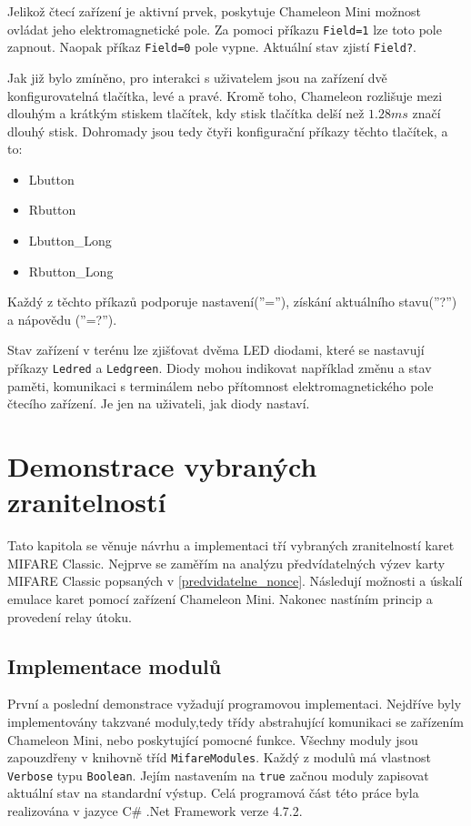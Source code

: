 Jelikož čtecí zařízení je aktivní prvek, poskytuje Chameleon Mini možnost ovládat jeho elektromagnetické pole. Za pomoci příkazu \verb|Field=1| lze toto pole zapnout. Naopak příkaz \verb|Field=0| pole vypne. Aktuální stav zjistí \verb|Field?|.\par
Jak již bylo zmíněno, pro interakci s uživatelem jsou na zařízení dvě konfigurovatelná tlačítka, levé a pravé. Kromě toho, Chameleon rozlišuje mezi dlouhým a krátkým stiskem tlačítek, kdy stisk tlačítka delší než $1.28ms$ značí dlouhý stisk. Dohromady jsou tedy čtyři konfigurační příkazy těchto tlačítek, a to:
\begin{itemize}
\item Lbutton
\item Rbutton
\item {Lbutton\_Long}
\item {Rbutton\_Long}
\end{itemize}
Každý z těchto příkazů podporuje nastavení(''=''), získání aktuálního stavu(''?'') a nápovědu (''=?''). \par
Stav zařízení v terénu lze zjišťovat dvěma LED diodami, které se nastavují příkazy \verb|Ledred| a \verb|Ledgreen|. Diody mohou indikovat například změnu a stav paměti, komunikaci s terminálem nebo přítomnost elektromagnetického pole čtecího zařízení. Je jen na uživateli, jak diody nastaví.\cite{ChameleonDocs}

    \chapter{Demonstrace vybraných zranitelností}
Tato kapitola se věnuje návrhu a implementaci tří vybraných zranitelností karet MIFARE Classic. Nejprve se zaměřím na analýzu předvídatelných výzev karty MIFARE Classic popsaných v \ref{predvidatelne_nonce}. Následují možnosti a úskalí emulace karet pomocí zařízení Chameleon Mini. Nakonec nastíním princip a provedení relay útoku.\par 

\section{Implementace modulů}
\label{implementaceModulu}
První a poslední demonstrace vyžadují programovou implementaci. Nejdříve byly implementovány takzvané moduly,tedy třídy abstrahující komunikaci se zařízením Chameleon Mini, nebo poskytující pomocné funkce. Všechny moduly jsou zapouzdřeny v knihovně tříd \verb|MifareModules|. Každý z modulů má vlastnost \verb|Verbose| typu \verb|Boolean|. Jejím nastavením na \verb|true| začnou moduly zapisovat aktuální stav na standardní výstup. Celá programová část této práce byla realizována v jazyce C\# .Net Framework verze 4.7.2.

